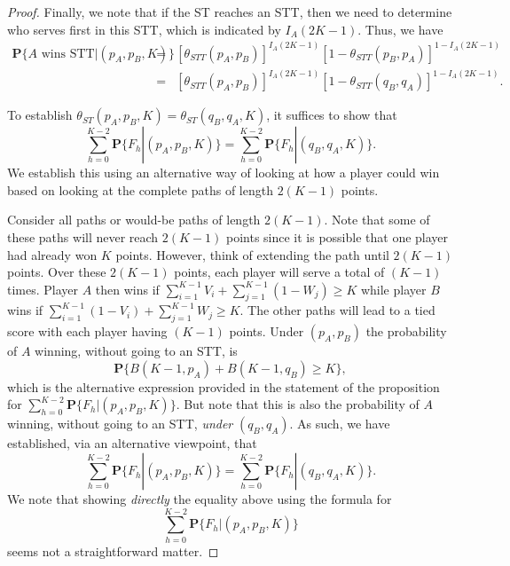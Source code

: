 \documentclass[11pt]{article}
\theoremstyle{plain}
\theoremstyle{definition}
\renewcommand{\Pr}{\mathbf{P}}
\newcommand{\OLDPROOF}[1]{}
\begin{document}
\begin{proof}
Finally, we note that if the ST reaches an STT, then we need to determine who serves first in this STT, which is indicated by $I_A(2K-1)$. Thus, we have 
%
\begin{eqnarray*}
\Pr\{\mbox{$A$ wins STT}|(p_A,p_B,K)\} & = & [\theta_{STT}(p_A,p_B)]^{I_A(2K-1)} [1-\theta_{STT}(p_B,p_A)]^{1 - I_A(2K-1)} \\ 
& = & [\theta_{STT}(p_A,p_B)]^{I_A(2K-1)} [1-\theta_{STT}(q_B,q_A)]^{1 - I_A(2K-1)}.   
\end{eqnarray*}

To establish $\theta_{ST}(p_A,p_B,K) = \theta_{ST}(q_B,q_A,K)$, it suffices to show that
%
$$\sum_{h=0}^{K-2} \Pr\{F_h|(p_A,p_B,K)\} = 
\sum_{h=0}^{K-2} \Pr\{F_h|(q_B,q_A,K)\}.$$
%
We establish this using an alternative way of looking at how a player could win based on looking at the complete paths of length $2(K-1)$ points.

Consider all paths or would-be paths of length $2(K-1)$. Note that some of these paths will never reach $2(K-1)$ points since it is possible that one player had already won $K$ points. However, think of extending the path until $2(K-1)$ points. Over these $2(K-1)$ points, each player will serve a total of $(K-1)$ times. 
Player $A$ then wins if
%
$\sum_{i=1}^{K-1} V_i + \sum_{j=1}^{K-1} (1-W_j) \ge K$
%
while player $B$ wins if
%
$\sum_{i=1}^{K-1} (1 - V_i) + \sum_{j=1}^{K-1} W_j \ge K.$
%
The other paths will lead to a tied score with each player having $(K-1)$ points. Under $(p_A,p_B)$ the probability of $A$ winning, without going to an STT, is
%
$$\Pr\{B(K-1,p_A) + B(K-1,q_B) \ge K\},$$
which is the alternative expression provided in the statement of the proposition for $\sum_{h=0}^{K-2} \Pr\{F_h|(p_A,p_B,K)\}$.
%
But note that this is also the probability of $A$ winning, without going to an STT, 
{\em under} $(q_B,q_A)$. As such, we have established, via an alternative viewpoint, that 
%
$$\sum_{h=0}^{K-2} \Pr\{F_h|(p_A,p_B,K)\} = 
\sum_{h=0}^{K-2} \Pr\{F_h|(q_B,q_A,K)\}.$$
% 
We note that showing {\em directly} the equality above using the formula for $$\sum_{h=0}^{K-2} \Pr\{F_h|(p_A,p_B,K)\}$$ seems not a straightforward matter.

   
    \OLDPROOF{ The first expression follows from the addition rule of probability and the decomposition of the event that $A$ wins the set tie-breaker.

}
\end{proof}
\end{document}
